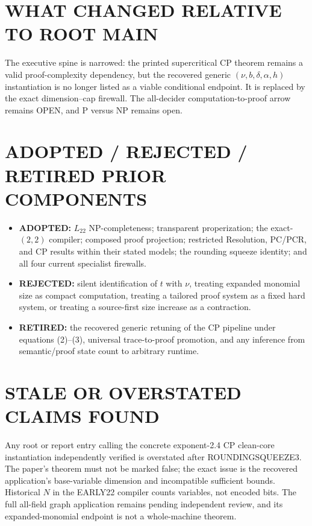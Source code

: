 \documentclass[11pt]{article}
\newcommand{\Ltwo}{L_{22}}
\begin{document}
\section{WHAT CHANGED RELATIVE TO ROOT MAIN}
The executive spine is narrowed: the printed supercritical CP theorem remains
a valid proof-complexity dependency, but the recovered generic
\((\nu,b,\delta,\alpha,h)\) instantiation is no longer listed as a viable
conditional endpoint.  It is replaced by the exact dimension--cap firewall.
The all-decider computation-to-proof arrow remains OPEN, and P versus NP
remains open.

\section{ADOPTED / REJECTED / RETIRED PRIOR COMPONENTS}
\begin{itemize}
\item \textbf{ADOPTED:} \(\Ltwo\) NP-completeness; transparent properization;
the exact-\((2,2)\) compiler; composed proof projection; restricted Resolution,
PC/PCR, and CP results within their stated models; the rounding squeeze
identity; and all four current specialist firewalls.
\item \textbf{REJECTED:} silent identification of \(t\) with \(\nu\), treating
expanded monomial size as compact computation, treating a tailored proof
system as a fixed hard system, or treating a source-first size increase as a
contraction.
\item \textbf{RETIRED:} the recovered generic retuning of the CP pipeline under
equations (2)--(3), universal trace-to-proof promotion, and any inference from
semantic/proof state count to arbitrary runtime.
\end{itemize}

\section{STALE OR OVERSTATED CLAIMS FOUND}
Any root or report entry calling the concrete exponent-2.4 CP clean-core
instantiation independently verified is overstated after ROUNDINGSQUEEZE3.
The paper's theorem must not be marked false; the exact issue is the recovered
application's base-variable dimension and incompatible sufficient bounds.
Historical \(N\) in the EARLY22 compiler counts variables, not encoded bits.
The full all-field graph application remains pending independent review, and
its expanded-monomial endpoint is not a whole-machine theorem.
\end{document}
